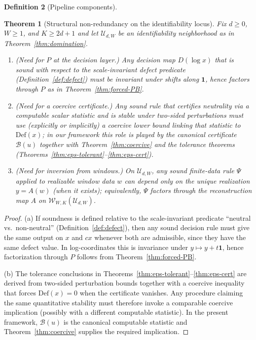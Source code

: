 \documentclass[11pt,reqno]{amsart}
\newtheorem{theorem}{Theorem}[section]
\theoremstyle{definition}
\newtheorem{definition}[theorem]{Definition}
\theoremstyle{remark}
\newcommand{\1}{\mathbf{1}}
\begin{document}
\begin{definition}[Pipeline components]
\begin{theorem}[Structural non-redundancy on the identifiability locus]\label{thm:nonredundancy}
Fix $d\ge 0$, $W\ge 1$, and $K\ge 2d+1$ and let $\mathcal U_{d,W}$ be an identifiability neighborhood as in Theorem~\ref{thm:domination}.
\begin{enumerate}[label=(\alph*)]
\item (Need for $P$ at the decision layer.) Any decision map $D(\log x)$ that is sound with respect to the scale-invariant defect predicate (Definition~\ref{def:defect}) must be invariant under shifts along $\mathbf 1$, hence factors through $P$ as in Theorem~\ref{thm:forced-PB}.
\item (Need for a coercive certificate.) Any sound rule that certifies neutrality via a computable scalar statistic and is stable under two-sided perturbations must use (explicitly or implicitly) a coercive lower bound linking that statistic to $\mathrm{Def}(x)$; in our framework this role is played by the canonical certificate $\mathcal B(u)$ together with Theorem~\ref{thm:coercive} and the tolerance theorems (Theorems~\ref{thm:eps-tolerant}--\ref{thm:eps-cert}).
\item (Need for inversion from windows.) On $\mathcal U_{d,W}$, any sound finite-data rule $\Psi$ applied to realizable window data $w$ can depend only on the unique realization $y=A(w)$ (when it exists); equivalently, $\Psi$ factors through the reconstruction map $A$ on $\mathcal W_{W,K}(\mathcal U_{d,W})$.
\end{enumerate}
\end{theorem}

\begin{proof}
(a) If soundness is defined relative to the scale-invariant predicate ``neutral vs.\ non-neutral'' (Definition~\ref{def:defect}), then any sound decision rule must give the same output on $x$ and $cx$ whenever both are admissible, since they have the same defect value.
In log-coordinates this is invariance under $y\mapsto y+t\mathbf 1$, hence factorization through $P$ follows from Theorem~\ref{thm:forced-PB}.

(b) The tolerance conclusions in Theorems~\ref{thm:eps-tolerant}--\ref{thm:eps-cert} are derived from two-sided perturbation bounds together with a coercive inequality that forces $\mathrm{Def}(x)=0$ when the certificate vanishes.
Any procedure claiming the same quantitative stability must therefore invoke a comparable coercive implication (possibly with a different computable statistic).
In the present framework, $\mathcal B(u)$ is the canonical computable statistic and Theorem~\ref{thm:coercive} supplies the required implication.


\end{proof}
\end{definition}
\end{document}

